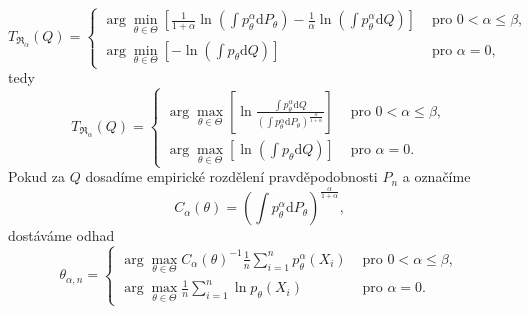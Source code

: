 \begin{equation}
	T_{\mathfrak{R}_\alpha}(Q) = 
	\begin{cases}
		 \displaystyle{ \arg \min_{\theta \in \Theta} \left[\frac{1}{1+\alpha} \ln(\int p_\theta^\alpha\mathrm{d}P_\theta) - \frac{1}{\alpha} \ln(\int p_\theta^\alpha\mathrm{d}Q) \right]} & \text{ pro } 0 < \alpha \leq \beta, \\
		 \displaystyle{ \arg \min_{\theta \in \Theta} \left[- \ln(\int p_\theta\mathrm{d}Q) \right] }& \text{ pro } \alpha = 0,
	\end{cases}	
\end{equation}
tedy
\begin{equation}
	T_{\mathfrak{R}_\alpha}(Q) = 
	\begin{cases}
		 \displaystyle{ \arg \max_{\theta \in \Theta} \left[\ln\frac{\int p_\theta^\alpha\mathrm{d}Q}{(\int p_\theta^\alpha\mathrm{d}P_\theta)^{\frac{\alpha}{1+\alpha}}} \right] }& \text{ pro } 0 < \alpha \leq \beta, \\
		 \displaystyle{ \arg \max_{\theta \in \Theta} \left[\ln(\int p_\theta\mathrm{d}Q) \right] }& \text{ pro } \alpha = 0.
	\end{cases}	
\end{equation}
Pokud za $Q$ dosadíme empirické rozdělení pravděpodobnosti $P_n$ a označíme 
\begin{equation}
	C_\alpha (\theta) = \left(\int p_\theta^\alpha\mathrm{d}P_\theta \right)^{\frac{\alpha}{1+\alpha}},
\end{equation}
dostáváme odhad 
\begin{equation}
	\theta_{\alpha,n} = 
	\begin{cases}
		\displaystyle{ \arg \max_{\theta \in \Theta} C_\alpha\left( \theta \right)^{-1} \frac{1}{n} \sum_{i=1}^n p_{\theta}^{\alpha}\left( X_i \right) } & \text{ pro } 0 < \alpha \leq \beta, \\
		\displaystyle{ \arg \max_{\theta \in \Theta}  \frac{1}{n} \sum_{i=1}^n \ln p_{\theta}\left( X_i \right) } & \text{ pro } \alpha = 0.
	\end{cases}	
	\label{Renyi-estimator_formula}
\end{equation}

